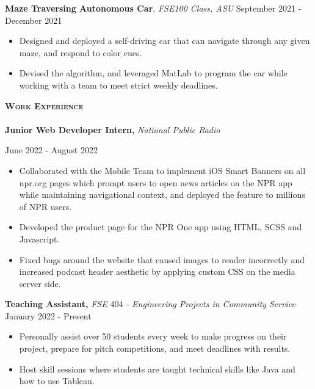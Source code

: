 \documentclass[a4paper]{article}
\newcommand{\lineunder} {
    \vspace*{-8pt} \\
    \hspace*{-18pt} \hrulefill \\
}
\newcommand{\header} [1] {
    {\hspace*{-15pt}\vspace*{3pt} \textsc{#1}}
    \vspace*{-6pt} \lineunder
}
\begin{document}
{\begin{itemize}
\end{itemize}

\textbf{Maze Traversing Autonomous Car}, \textit{FSE100 Class, ASU}
\hfill September 2021 - December 2021\\
\vspace{-3mm}
\begin{itemize}
    \itemsep-0.05em
    \item Designed and deployed a self-driving car that can navigate through any given maze, and respond to color cues. 
    \item Devised the algorithm, and leveraged MatLab to program the car while working with a team to meet strict weekly deadlines. 
\end{itemize}

\vspace{-1mm}
    \header{\textbf{Work Experience}}
    \textbf{Junior Web Developer Intern, } \textit{National Public Radio} }   \hfill June 2022 - August 2022\\
\vspace{-3mm}
\begin{itemize}
    \itemsep-0.05em
     \item Collaborated with the Mobile Team to implement iOS Smart Banners on all npr.org pages which prompt users to open news articles on the NPR app while maintaining navigational context, and deployed the feature to millions of NPR users. 
    \item Developed the product page for the NPR One app using HTML, SCSS and Javascript. 
    \item Fixed bugs around the website that caused images to render incorrectly and increased podcast header aesthetic by applying custom CSS on the media server side. 
\end{itemize}

    \textbf{Teaching Assistant, } \textit{FSE} 404 \textit{- Engineering Projects in Community Service} \hfill January 2022 - Present\\
    \vspace{-3mm}
    \begin{itemize}
        \itemsep-0.05em
        \item Personally assist over 50 students every week to make progress on their project, prepare for pitch competitions, and meet deadlines with results. 
        \item Host skill sessions where students are taught technical skills like Java and how to use Tableau.
    \end{itemize}
\end{document}
